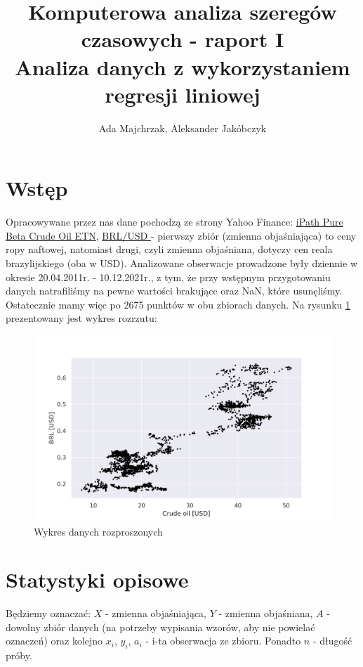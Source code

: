 \documentclass[fleqn]{article}
\author{Ada Majchrzak, Aleksander Jakóbczyk}
\title{Komputerowa analiza szeregów czasowych - raport I \\[1ex] \large Analiza danych z wykorzystaniem regresji liniowej}
\begin{document}
    \maketitle

    \section{Wstęp}

  Opracowywane przez nas dane pochodzą ze strony Yahoo Finance:
  \href{https://finance.yahoo.com/quote/OIL?p=OIL}{\color{blue} iPath Pure Beta Crude Oil ETN},
  \href{https://finance.yahoo.com/quote/BRLUSD%3DX?p=BRLUSD%3DX}{\color{blue} BRL/USD }
  - pierwszy zbiór (zmienna objaśniająca) to ceny ropy naftowej, 
  natomiast drugi, czyli zmienna objaśniana, dotyczy cen reala brazylijskiego (oba w USD). Analizowane obserwacje prowadzone były dziennie
  w okresie 20.04.2011r. - 10.12.2021r., z tym, że przy wstępnym przygotowaniu danych natrafiliśmy na pewne wartości brakujące oraz NaN, 
  które usunęliśmy. Ostatecznie mamy więc po 2675 punktów w obu zbiorach danych. Na rysunku \ref{1} prezentowany jest wykres rozrzutu:

    \begin{figure}[H]
        \includegraphics[width=1\textwidth]{fig1.png}
        \centering
        \caption{Wykres danych rozproszonych}
        \label{1}
    \end{figure}

    \clearpage

    \section{Statystyki opisowe}

    Będziemy oznaczać: $X$ - zmienna objaśniająca, $Y$ - zmienna objaśniana, $A$ - dowolny zbiór danych (na potrzeby wypisania wzorów, aby nie powielać oznaczeń)
    oraz kolejno $x_{i}$, $y_{i}$, $a_{i}$ - i-ta obserwacja ze zbioru. Ponadto $n$ - długość próby.
\end{document}
